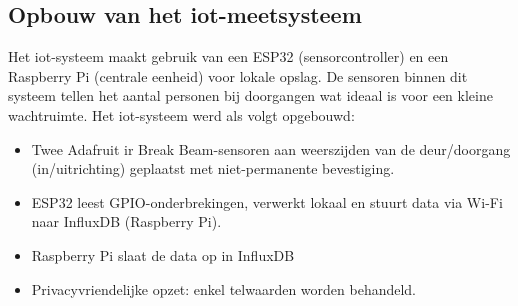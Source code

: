 






\subsection{Opbouw van het \gls{iot}-meetsysteem}
Het \gls{iot}-systeem maakt gebruik van een ESP32 (sensorcontroller) en een Raspberry Pi (centrale eenheid) voor lokale opslag. De sensoren binnen dit systeem tellen het aantal personen bij doorgangen wat ideaal is voor een kleine wachtruimte. Het \gls{iot}-systeem werd als volgt opgebouwd: 

\begin{itemize}
    \item Twee Adafruit \gls{ir} Break Beam-sensoren aan weerszijden van de deur/doorgang (in/uitrichting) geplaatst met niet-permanente bevestiging.
    \item ESP32 leest GPIO-onderbrekingen, verwerkt lokaal en stuurt data via Wi-Fi naar InfluxDB (Raspberry Pi).
    \item Raspberry Pi slaat de data op in InfluxDB
    \item Privacyvriendelijke opzet: enkel telwaarden worden behandeld.
\end{itemize}

